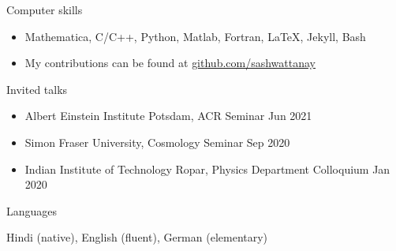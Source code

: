 \documentclass{resume} %
\begin{document}
\begin{rSection}{Computer skills}


\begin{itemize}
\item Mathematica, C/C++, Python, Matlab, Fortran, LaTeX, Jekyll, Bash
\item My contributions can be found at  \href{https://github.com/sashwattanay}{github.com/sashwattanay} 
\end{itemize}


\end{rSection}
  



\begin{rSection}{Invited talks}


\begin{itemize}
\item Albert Einstein Institute Potsdam, ACR Seminar \hfill Jun 2021
\item Simon Fraser University, Cosmology Seminar \hfill Sep 2020
\item Indian Institute of Technology Ropar, Physics Department Colloquium \hfill Jan 2020
\end{itemize}


\end{rSection}






\begin{rSection}{Languages}


Hindi (native), English (fluent), German (elementary)


\end{rSection}



\end{document}

